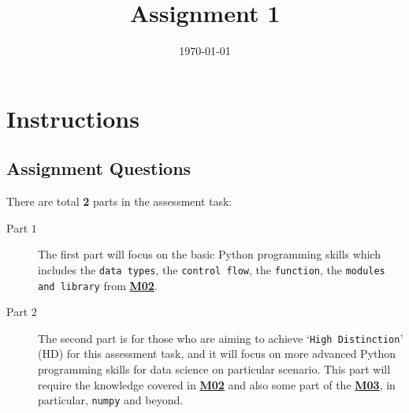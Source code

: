 \documentclass[a4paper]{article}
\date{\today}
\title{Assignment 1}
\begin{document}
    \header{}



    \begin{center}
 
      \end{center}

      \section*{Instructions}


      \subsection*{Assignment Questions}\label{sec:question}
      
      There are total \textbf{2} parts in the assessment task:
      \begin{description}
      \item[Part $1$] 
      The first part will focus on the basic Python programming skills
      which includes the \texttt{data types}, the \texttt{control flow}, the \texttt{function},
      the \texttt{modules and library} from \href{https://github.com/tulip-lab/sit742/tree/develop/Jupyter/M02-Python}{\textbf{M02}}.
          
      \item[Part $2$] 
      The second part is for those who are aiming to 
      achieve `\texttt{High Distinction}' (HD) for this assessment task,
      and it will focus on more advanced Python programming skills for data science on particular scenario. 
      This part will require the knowledge covered in \href{https://github.com/tulip-lab/sit742/tree/develop/Jupyter/M02-Python}{\textbf{M02}} and also some part of the \href{https://github.com/tulip-lab/sit742/blob/develop/Jupyter/M03-BigData/M03D-DataAcquisition-I.ipynb}{\textbf{M03}}, 
      in particular, 
      \texttt{numpy} and beyond.
      \end{description}
      
\end{document}

